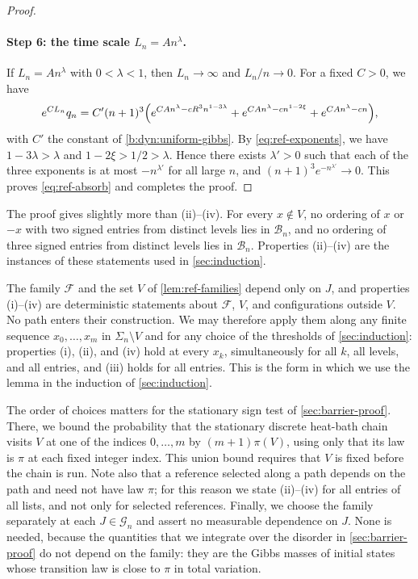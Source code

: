 \begin{proof}
\paragraph{Step 6: the time scale $L_n=An^\lambda$.}
If $L_n=An^\lambda$ with $0<\lambda<1$, then $L_n\to\infty$ and
$L_n/n\to0$. For a fixed $C>0$, we have
\[
 e^{CL_n}q_n=C'(n+1)^3\Bigl(e^{CAn^\lambda-cR^3n^{1-3\lambda}}
   +e^{CAn^\lambda-cn^{1-2\xi}}+e^{CAn^\lambda-cn}\Bigr),
\]
with $C'$ the constant of \eqref{b:dyn:uniform-gibbs}. By
\eqref{eq:ref-exponents}, we have $1-3\lambda>\lambda$ and
$1-2\xi>1/2>\lambda$. Hence there exists $\lambda'>0$ such that each of the
three exponents is at most $-n^{\lambda'}$ for all large $n$, and
$(n+1)^3e^{-n^{\lambda'}}\to0$. This proves \eqref{eq:ref-absorb} and
completes the proof.
\end{proof}

The proof gives slightly more than (ii)--(iv). For every $x\notin V$, no
ordering of $x$ or $-x$ with two signed entries from distinct levels lies in
$\mathcal B_n$, and no ordering of three signed entries from distinct levels
lies in $\mathcal B_n$. Properties (ii)--(iv) are the instances of these
statements used in \cref{sec:induction}.

\begin{remark}
\label{rem:ref-every-path}
The family $\mathcal F$ and the set $V$ of \cref{lem:ref-families} depend
only on $J$, and properties (i)--(iv) are deterministic statements about
$\mathcal F$, $V$, and configurations outside $V$. No path enters their
construction. We may therefore apply them along any finite sequence
$x_0,\ldots,x_m$ in $\Sigma_n\setminus V$ and for any choice of the
thresholds of \cref{sec:induction}: properties (i), (ii), and (iv) hold at
every $x_k$, simultaneously for all $k$, all levels, and all entries, and
(iii) holds for all entries. This is the form in which we use the lemma in
the induction of \cref{sec:induction}.

The order of choices matters for the stationary sign test of
\cref{sec:barrier-proof}. There, we bound the probability that the
stationary discrete heat-bath chain visits $V$ at one of the indices
$0,\ldots,m$ by $(m+1)\pi(V)$, using only that its law is $\pi$ at each fixed
integer index. This union bound requires that $V$ is fixed before the chain
is run. Note also that a
reference selected along a path depends on the path and need not have law
$\pi$; for this reason we state (ii)--(iv) for all entries of all lists, and
not only for selected references. Finally, we choose the family separately
at each $J\in\mathcal G_n$ and assert no measurable dependence on $J$.
None is needed, because the quantities that we integrate over the disorder
in \cref{sec:barrier-proof} do not depend on the family: they are the Gibbs
masses of initial states whose transition law is close to $\pi$ in total
variation.
\end{remark}

